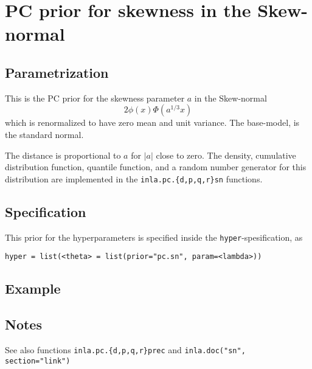 \documentclass[a4paper,11pt]{article}
\begin{document}
\section*{PC prior for skewness in the Skew-normal}

\subsection*{Parametrization}
This is the PC prior for the skewness parameter $a$ in the Skew-normal 
\begin{displaymath}
    2\phi(x)\Phi(a^{1/3}x)
\end{displaymath}
which is renormalized to have zero mean and unit variance. The
base-model, is the standard normal. 

The distance is proportional to $a$ for $|a|$ close to zero. The
density, cumulative distribution function, quantile function, and a
random number generator for this distribution are implemented in the
\texttt{inla.pc.\{d,p,q,r\}sn} functions.

\subsection*{Specification}
This prior for the hyperparameters is specified inside the
\texttt{hyper}-spesification, as
\begin{center}
    \texttt{hyper = list(<theta> =
        list(prior="pc.sn", param=<lambda>))}
\end{center}

\subsection*{Example}

\subsection*{Notes}

See also functions \texttt{inla.pc.\{d,p,q,r\}prec} and
\texttt{inla.doc("sn", section="link")}
\end{document}
